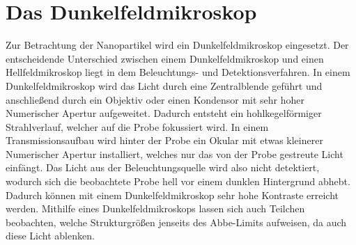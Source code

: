 \section{Das Dunkelfeldmikroskop}

Zur Betrachtung der Nanopartikel wird ein Dunkelfeldmikroskop eingesetzt. Der entscheidende Unterschied zwischen einem Dunkelfeldmikroskop und einen Hellfeldmikroskop liegt in dem Beleuchtungs- und Detektionsverfahren. In einem Dunkelfeldmikroskop wird das Licht durch eine Zentralblende geführt und anschließend durch ein Objektiv oder einen Kondensor mit sehr hoher Numerischer Apertur aufgeweitet. Dadurch entsteht ein hohlkegelförmiger Strahlverlauf, welcher auf die Probe fokussiert wird. In einem Transmissionsaufbau wird hinter der Probe ein Okular mit etwas kleinerer Numerischer Apertur installiert, welches nur das von der Probe gestreute Licht einfängt. Das Licht aus der Beleuchtungsquelle wird also nicht detektiert, wodurch sich die beobachtete Probe hell vor einem dunklen Hintergrund abhebt. Dadurch können mit einem Dunkelfeldmikroskop sehr hohe Kontraste erreicht werden. Mithilfe eines Dunkelfeldmikroskops lassen sich auch Teilchen beobachten, welche Strukturgrößen jenseits des Abbe-Limits aufweisen, da auch diese Licht ablenken. \cite{anleitung}\\

